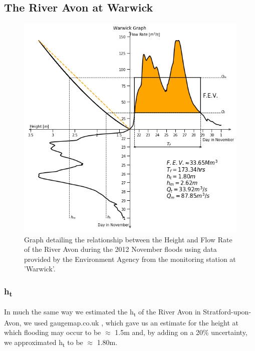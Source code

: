 \documentclass[11 pt, a4paper]{article}
\begin{document}
\subsection{The River Avon at Warwick}
\begin{figure}[H]
\begin{center}
\includegraphics[width=.5\linewidth]{Warwick-Quadrant_Graph.png}
\caption{Graph detailing the relationship between the Height and Flow Rate of the River Avon during the 2012 November floods using data provided by the Environment Agency from the monitoring station at 'Warwick'.}
\end{center}
\end{figure}
\subsubsection{h\textsubscript{t}}
In much the same way we estimated the h\textsubscript{t} of the River Avon in Stratford-upon-Avon, we used gaugemap.co.uk \cite{7}, which gave us an estimate for the height at which flooding may occur to be $\approx$ 1.5m and, by adding on a 20\% uncertainty, we approximated h\textsubscript{t} to be $\approx$ 1.80m.
\end{document}
